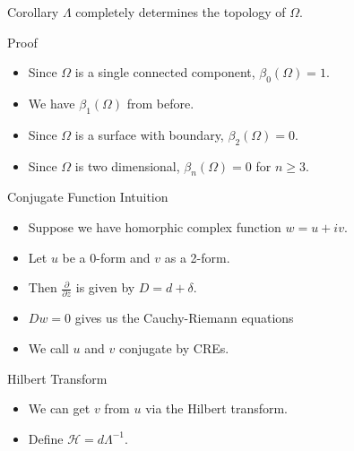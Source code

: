 \documentclass[aspectratio=169]{beamer}
\newcommand{\hilbert}{\mathcal{H}}
\begin{document}
\begin{frame}{Corollary}
\vfill
    $\Lambda$ completely determines the topology of $\Omega$.
\vfill
\end{frame}

\begin{frame}{Proof}
\vfill
\pause
    \begin{itemize}
        \item Since $\Omega$ is a single connected component, $\beta_0(\Omega)=1$.
        \item We have $\beta_1(\Omega)$ from before.
        \item Since $\Omega$ is a surface with boundary, $\beta_2(\Omega)=0$.
        \item Since $\Omega$ is two dimensional, $\beta_n(\Omega)=0$ for $n\geq 3$.
    \end{itemize}
\vfill
\end{frame}

\begin{frame}{Conjugate Function Intuition}
\vfill
\begin{itemize}
   \pause
   \item Suppose we have homorphic complex function $w = u + i v$.  
   
   \pause
   \item Let $u$ be a 0-form and $v$ as a 2-form.
   
   \pause
   \item Then $\frac{\partial}{\partial \overline{z}}$ is given by $D=d+\delta$.
   
   \pause
   \item $Dw=0$ gives us the Cauchy-Riemann equations
    
   \item We call $u$ and $v$ conjugate by CREs.    
\end{itemize}
\vfill
\end{frame}

\begin{frame}{Hilbert Transform}
\vfill
\begin{itemize}
    \pause
    \item We can get $v$ from $u$ via the Hilbert transform.
    
    \pause
    \item Define $\hilbert = d \Lambda^{-1}$.
\end{itemize}
\vfill
\end{frame}
\end{document}
